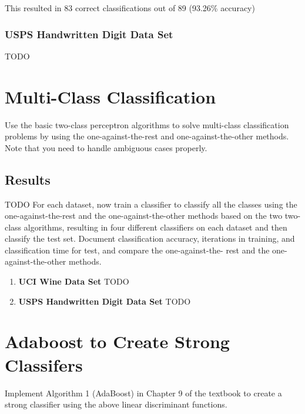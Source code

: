 \documentclass{article}
\newcommand{\result}[1]{\subsubsection*{#1}}
\begin{document}
This resulted in 83 correct classifications out of 89 (93.26\% accuracy)

\result{USPS Handwritten Digit Data Set}
{\large TODO}


\section{Multi-Class Classification}
Use the basic two-class perceptron algorithms to solve multi-class classification problems by using the one-against-the-rest and one-against-the-other methods. Note that you need to handle ambiguous cases properly.

\subsection{Results}
{\large TODO}
For each dataset, now train a classifier to classify all the classes using the one-against-the-rest and the one-against-the-other methods based on the two two-class algorithms, resulting in four different classifiers on each dataset and then classify the test set. Document classification accuracy, iterations in training, and classification time for test, and compare the one-against-the- rest and the one-against-the-other methods.

\begin{enumerate}
\item {\bf UCI Wine Data Set}
{\large TODO}
\item {\bf USPS Handwritten Digit Data Set}
{\large TODO}
\end{enumerate}


\section{Adaboost to Create Strong Classifers}
Implement Algorithm 1 (AdaBoost) in Chapter 9 of the textbook to create a strong classifier using the above linear discriminant functions.
\end{document}
